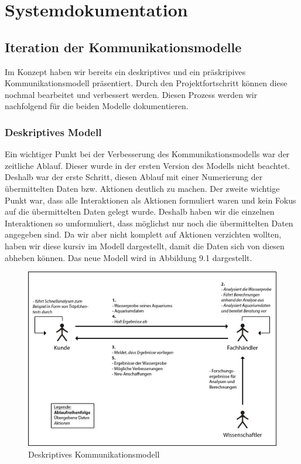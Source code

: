 \chapter{Systemdokumentation}

\section{Iteration der Kommunikationsmodelle}

Im Konzept haben wir bereits ein deskriptives und ein präskripives Kommunikationsmodell präsentiert. Durch den Projektfortschritt können diese nochmal bearbeitet und verbessert werden. Diesen Prozess werden wir nachfolgend für die beiden Modelle dokumentieren.

\subsection{Deskriptives Modell}

Ein wichtiger Punkt bei der Verbesserung des Kommunikationsmodells war der zeitliche Ablauf. Dieser wurde in der ersten Version des Modells nicht beachtet. Deshalb war der erste Schritt, diesen Ablauf mit einer Numerierung der übermittelten Daten bzw. Aktionen deutlich zu machen. Der zweite wichtige Punkt war, dass alle Interaktionen als Aktionen formuliert waren und kein Fokus auf die übermittelten Daten gelegt wurde. Deshalb haben wir die einzelnen Interaktionen so umformuliert, dass möglichst nur noch die übermittelten Daten angegeben sind. Da wir aber nicht komplett auf Aktionen verzichten wollten, haben wir diese kursiv im Modell dargestellt, damit die Daten sich von diesen abheben können. Das neue Modell wird in Abbildung 9.1 dargestellt.

\begin{figure}[htbp]
\centering
\includegraphics[width=0.85\linewidth]{Kommunikationsdiagramm1}
\caption{Deskriptives Kommunikationsmodell}
\end{figure}

